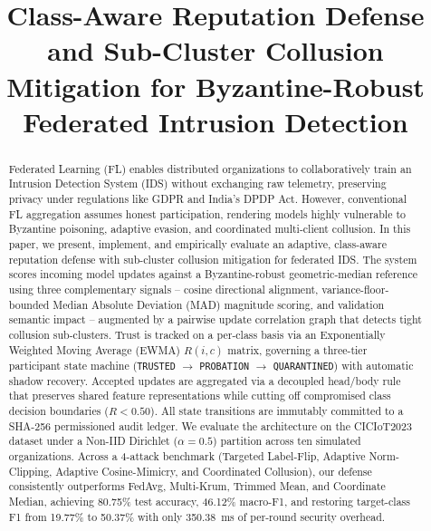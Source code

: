 \documentclass[conference]{IEEEtran}
\begin{document}
\title{Class-Aware Reputation Defense and Sub-Cluster Collusion Mitigation for Byzantine-Robust Federated Intrusion Detection}

\author{
}

\maketitle

\begin{abstract}
Federated Learning (FL) enables distributed organizations to collaboratively train an Intrusion Detection System (IDS) without exchanging raw telemetry, preserving privacy under regulations like GDPR and India's DPDP Act. However, conventional FL aggregation assumes honest participation, rendering models highly vulnerable to Byzantine poisoning, adaptive evasion, and coordinated multi-client collusion. In this paper, we present, implement, and empirically evaluate an adaptive, class-aware reputation defense with sub-cluster collusion mitigation for federated IDS. The system scores incoming model updates against a Byzantine-robust geometric-median reference using three complementary signals -- cosine directional alignment, variance-floor-bounded Median Absolute Deviation (MAD) magnitude scoring, and validation semantic impact -- augmented by a pairwise update correlation graph that detects tight collusion sub-clusters. Trust is tracked on a per-class basis via an Exponentially Weighted Moving Average (EWMA) $R(i, c)$ matrix, governing a three-tier participant state machine (\texttt{TRUSTED} $\to$ \texttt{PROBATION} $\to$ \texttt{QUARANTINED}) with automatic shadow recovery. Accepted updates are aggregated via a decoupled head/body rule that preserves shared feature representations while cutting off compromised class decision boundaries ($R < 0.50$). All state transitions are immutably committed to a SHA-256 permissioned audit ledger. We evaluate the architecture on the CICIoT2023 dataset under a Non-IID Dirichlet ($\alpha = 0.5$) partition across ten simulated organizations. Across a 4-attack benchmark (Targeted Label-Flip, Adaptive Norm-Clipping, Adaptive Cosine-Mimicry, and Coordinated Collusion), our defense consistently outperforms FedAvg, Multi-Krum, Trimmed Mean, and Coordinate Median, achieving 80.75\% test accuracy, 46.12\% macro-F1, and restoring target-class F1 from 19.77\% to 50.37\% with only 350.38~ms of per-round security overhead.
\end{abstract}
\end{document}

